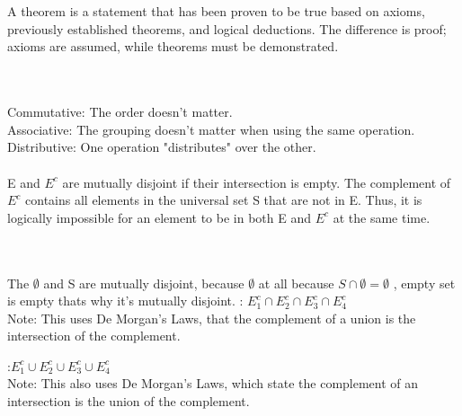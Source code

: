 \documentclass[12pt]{article}
\begin{document}


\begin{enumerate}

\\\\ A theorem is a statement that has been proven to be true based on axioms, previously established theorems, and logical deductions. The difference is proof; axioms are assumed, while theorems must be demonstrated. 

\\\\Commutative: The order doesn't matter. \\Associative: The grouping doesn't matter when using the same operation. \\Distributive: One operation "distributes" over the other. 
\\\\E and $E^c$ are mutually disjoint if their intersection is empty. The complement of $E^c$ contains all elements in the universal set S that are not in E. Thus, it is logically impossible for an element to be in both E and $E^c$ at the same time. 

\\\\
The $\emptyset$ and S are mutually disjoint, because $\emptyset$ at all because $S \cap \emptyset = \emptyset$ , empty set is empty thats why it's mutually disjoint. 
: $E_1^c \cap E_2^c \cap E_3^c \cap E_4^c$ \\
Note: This uses De Morgan's Laws, that the complement of a union is the intersection of the complement.


 :$E_1^c \cup E_2^c \cup E_3^c \cup E_4^c$
\\Note: This also uses De Morgan's Laws, which state the complement of an intersection is the union of the complement.


\end{enumerate}
\end{document}
